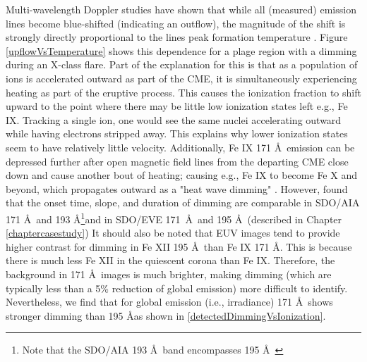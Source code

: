 Multi-wavelength Doppler studies have shown that while all (measured) emission lines become blue-shifted (indicating an outflow), the magnitude of the shift is strongly directly proportional to the lines peak formation temperature \citep{Imada2007, Jin2009}. Figure \ref{upflowVsTemperature} shows this dependence for a plage region with a dimming during an X-class flare. Part of the explanation for this is that as a population of ions is accelerated outward as part of the CME, it is simultaneously experiencing heating as part of the eruptive process. This causes the ionization fraction to shift upward to the point where there may be little low ionization states left e.g., Fe IX. Tracking a single ion, one would see the same nuclei accelerating outward while having electrons stripped away. This explains why lower ionization states seem to have relatively little velocity. Additionally, Fe IX 171 \AA\ emission can be depressed further after open magnetic field lines from the departing CME close down and cause another bout of heating; causing e.g., Fe IX to become Fe X and beyond, which propagates outward as a "heat wave dimming" \citep{Robbrecht2010}. However, \citet{Mason2014} found that the onset time, slope, and duration of dimming are comparable in SDO/AIA 171 \AA\ and 193 \AA\footnote{Note that the SDO/AIA 193 \AA\ band encompasses 195 \AA\ }and in SDO/EVE 171 \AA\ and 195 \AA\ (described in Chapter \ref{chaptercasestudy}) It should also be noted that EUV images tend to provide higher contrast for dimming in Fe XII 195 \AA\ than Fe IX 171 \AA. This is because there is much less Fe XII in the quiescent corona than Fe IX. Therefore, the background in 171 \AA\ images is much brighter, making dimming (which are typically less than a 5\% reduction of global emission) more difficult to identify. Nevertheless, we find that for global emission (i.e., irradiance) 171 \AA\ shows stronger dimming than 195 \AA as shown in \ref{detectedDimmingVsIonization}. 

